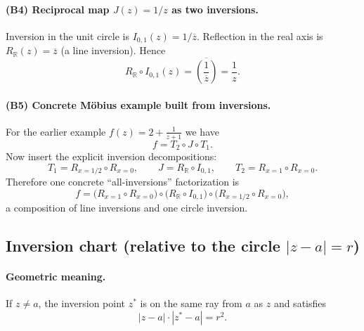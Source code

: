 \documentclass[12pt,a4paper]{article}
\theoremstyle{plain}
\theoremstyle{definition}      %
\begin{document}
\paragraph{\textbf{(B4) Reciprocal map $J(z)=1/z$ as two inversions.}}
Inversion in the unit circle is $I_{0,1}(z)=1/\overline{z}$.
Reflection in the real axis is $R_{\mathbb R}(z)=\overline{z}$ (a line inversion).
Hence
\[
R_{\mathbb R}\circ I_{0,1}(z)=\overline{\left(\frac{1}{\overline{z}}\right)}=\frac{1}{z}.
\]

\paragraph{\textbf{(B5) Concrete Möbius example built from inversions.}}
For the earlier example $f(z)=2+\frac{1}{z+1}$ we have
\[
f = T_{2}\circ J \circ T_{1}.
\]
Now insert the explicit inversion decompositions:
\[
T_{1}=R_{x=1/2}\circ R_{x=0},
\qquad
J=R_{\mathbb R}\circ I_{0,1},
\qquad
T_{2}=R_{x=1}\circ R_{x=0}.
\]
Therefore one concrete “all-inversions” factorization is
\[
f
=
\bigl(R_{x=1}\circ R_{x=0}\bigr)
\circ
\bigl(R_{\mathbb R}\circ I_{0,1}\bigr)
\circ
\bigl(R_{x=1/2}\circ R_{x=0}\bigr),
\]
a composition of line inversions and one circle inversion.


\subsection*{\textbf{Inversion chart (relative to the circle $|z-a|=r$)}}

\paragraph{\textbf{Geometric meaning.}}
If $z\neq a$, the inversion point $z^{*}$ is on the same ray from $a$ as $z$ and satisfies
\[
|z-a|\cdot|z^{*}-a|=r^{2}.
\]
\end{document}
